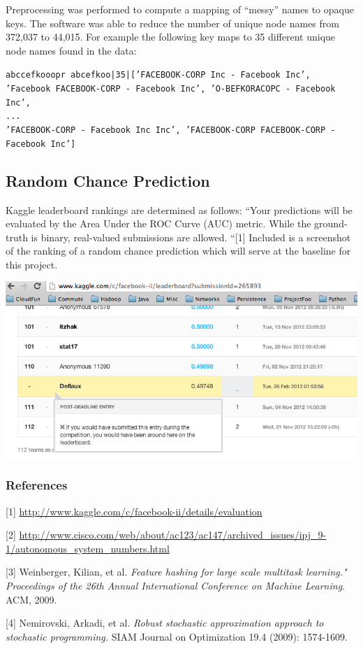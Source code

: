 \documentclass{article} %
\begin{document}
Preprocessing was performed to compute a mapping of ``messy'' names to opaque
keys.  The software was able to reduce the number of unique node names from
372,037 to 44,015. For example the following key maps to 35 different unique node names
found in the data:

{\small \texttt{abccefkooopr abcefkoo|35|['FACEBOOK-CORP Inc - Facebook
    Inc', 'Facebook FACEBOOK-CORP - Facebook Inc', 'O-BEFKORACOPC - Facebook
    Inc', \\
... \\'FACEBOOK-CORP - Facebook Inc Inc', 'FACEBOOK-CORP FACEBOOK-CORP - Facebook Inc']}}

\subsection{Random Chance Prediction}

Kaggle leaderboard rankings are determined as follows: ``Your predictions
will be evaluated by the Area Under the ROC Curve (AUC) metric.  While the
ground-truth is binary, real-valued submissions are allowed. ``[1]  Included
is a screenshot of the ranking of a random chance prediction which will
serve at the baseline for this project.

  \begin{center}
    \includegraphics[scale=.4]{randomPredictions.png}
  \end{center}

\subsubsection*{References}

\small{
[1] \url{http://www.kaggle.com/c/facebook-ii/details/evaluation}

[2] \url{http://www.cisco.com/web/about/ac123/ac147/archived_issues/ipj_9-1/autonomous_system_numbers.html}

[3] Weinberger, Kilian, et al. {\it Feature hashing for large scale multitask learning." Proceedings of the 26th Annual International Conference on Machine Learning.} ACM, 2009.

[4] Nemirovski, Arkadi, et al. {\it Robust stochastic approximation approach to stochastic programming.} SIAM Journal on Optimization 19.4 (2009): 1574-1609.
}
\end{document}
